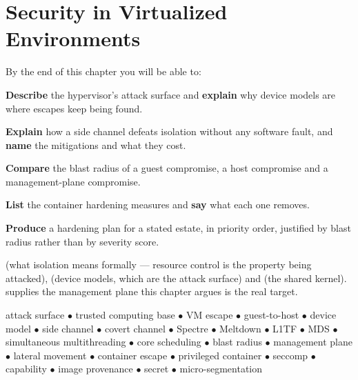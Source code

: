 \chapter{Security in Virtualized Environments}\label{ch:security}

\begin{outcomes}
By the end of this chapter you will be able to:
\begin{tight}
  \item \textbf{Describe} the hypervisor's attack surface and \textbf{explain}
        why device models are where escapes keep being found.
  \item \textbf{Explain} how a side channel defeats isolation without any
        software fault, and \textbf{name} the mitigations and what they cost.
  \item \textbf{Compare} the blast radius of a guest compromise, a host
        compromise and a management-plane compromise.
  \item \textbf{List} the container hardening measures and \textbf{say} what
        each one removes.
  \item \textbf{Produce} a hardening plan for a stated estate, in priority
        order, justified by blast radius rather than by severity score.
\end{tight}
\end{outcomes}

\begin{prereq}
 (what isolation means formally --- resource control is the property
being attacked),  (device models, which are the attack surface)
and  (the shared kernel).  supplies the
management plane this chapter argues is the real target.
\end{prereq}

\begin{keyterms}
attack surface $\bullet$ trusted computing base $\bullet$ VM escape $\bullet$
guest-to-host $\bullet$ device model $\bullet$ side channel $\bullet$ covert
channel $\bullet$ Spectre $\bullet$ Meltdown $\bullet$ L1TF $\bullet$ MDS
$\bullet$ simultaneous multithreading $\bullet$ core scheduling $\bullet$
blast radius $\bullet$ management plane $\bullet$ lateral movement $\bullet$
container escape $\bullet$ privileged container $\bullet$ seccomp $\bullet$
capability $\bullet$ image provenance $\bullet$ secret $\bullet$
micro-segmentation
\end{keyterms}


